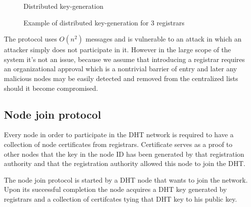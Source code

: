 \begin{figure}
\begin{msc}{Distributed key-generation}
\setlength{\instdist}{5.5cm}
\setlength{\envinstdist}{3cm}
\nextlevel[5]
\nextlevel[2]
\nextlevel[2]
\nextlevel[2]
\nextlevel[2]
\nextlevel[2]
\nextlevel[2]
\nextlevel[2]
\nextlevel[2]
\nextlevel[2]
\nextlevel[4]
\end{msc}
\caption{Example of distributed key-generation for 3 registrars}
\label{fig:key_gen_example}
\end{figure}

The protocol uses $O\left(n^2\right)$ messages and is vulnerable to an attack in
which an attacker simply does not participate in it. However in the large scope
of the system it's not an issue, because we assume that introducing a registrar
requires an organizational approval which is a nontrivial barrier of entry and
later any malicious nodes may be easily detected and removed from the
centralized lists should it become compromised.

\subsection{Node join protocol}

Every node in order to participate in the DHT network is required to have a
collection of node certificates from registrars. Certificate serves as a proof
to other nodes that the key in the node ID has been generated by that
registration authority and that the registration authority allowed this node to
join the DHT.

The node join protocol is started by a DHT node that wants to join the network.
Upon its successful completion the node acquires a DHT key generated by
registrars and a collection of certifcates tying that DHT key to his public key.

